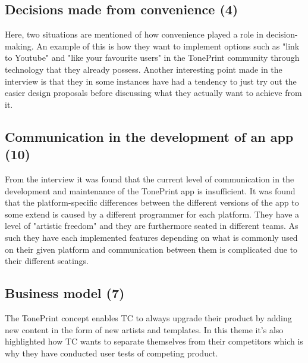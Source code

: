 \subsection*{Decisions made from convenience (4)}
\label{App:ThemeDecisionsMadeFromConvenience}
Here, two situations are mentioned of how convenience played a role in decision-making. An example of this is how they want to implement options such as "link to Youtube" and "like your favourite users" in the TonePrint community through technology that they already possess. Another interesting point made in the interview is that they in some instances have had a tendency to just try out the easier design proposals before discussing what they actually want to achieve from it.

\subsection*{Communication in the development of an app (10)}
\label{App:ThemeCommunicationInTheDevelopmentOfAnApp}
From the interview it was found that the current level of communication in the development and maintenance of the TonePrint app is insufficient. It was found that the platform-specific differences between the different versions of the app to some extend is caused by a different programmer for each platform. They have a level of "artistic freedom" and they are furthermore seated in different teams. As such they have each implemented features depending on what is commonly used on their given platform and communication between them is complicated due to their different seatings.

\subsection*{Business model (7)}
\label{App:ThemeBusinessModel}
The TonePrint concept enables TC to always upgrade their product by adding new content in the form of new artists and templates. In this theme it's also highlighted how TC wants to separate themselves from their competitors which is why they have conducted user tests of competing product.

